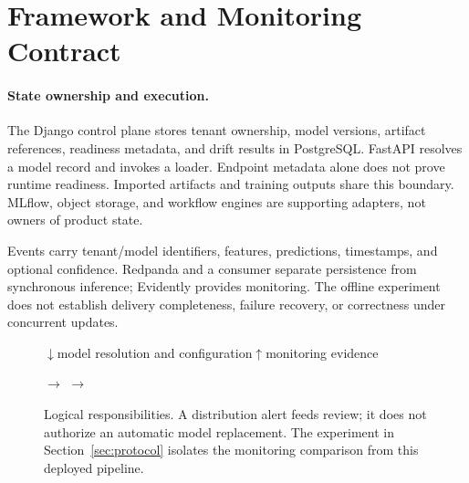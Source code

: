 \documentclass[runningheads]{llncs}
\begin{document}
\section{Framework and Monitoring Contract}
\label{sec:framework}
\paragraph{State ownership and execution.}
The Django control plane stores tenant ownership, model versions, artifact references, readiness metadata, and drift results in PostgreSQL. FastAPI resolves a model record and invokes a loader. Endpoint metadata alone does not prove runtime readiness. Imported artifacts and training outputs share this boundary. MLflow, object storage, and workflow engines are supporting adapters, not owners of product state.

Events carry tenant/model identifiers, features, predictions, timestamps, and optional confidence. Redpanda and a consumer separate persistence from synchronous inference; Evidently provides monitoring. The offline experiment does not establish delivery completeness, failure recovery, or correctness under concurrent updates.

\begin{figure}[t]
\centering
\small
{}
\par\smallskip
$\downarrow$\quad model resolution and configuration\quad$\uparrow$\quad monitoring evidence
\par\smallskip
{}
$\longrightarrow$
$\longrightarrow$
\caption{Logical responsibilities. A distribution alert feeds review; it does not authorize an automatic model replacement. The experiment in Section~\ref{sec:protocol} isolates the monitoring comparison from this deployed pipeline.}
\label{fig:architecture}
\end{figure}
\end{document}
